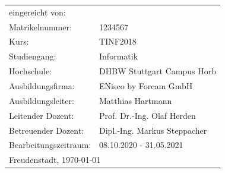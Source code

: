\begin{tabular}{ll}
    eingereicht von:\hspace{1cm} & \author{}
    \tabularnewline
    Matrikelnummer: & 1234567
    \tabularnewline
    Kurs: & TINF2018
    \tabularnewline
    Studiengang: & Informatik
    \tabularnewline
    Hochschule: & DHBW Stuttgart Campus Horb
    \tabularnewline
    Ausbildungsfirma: & ENisco by Forcam GmbH
    \tabularnewline
    Ausbildungsleiter: & Matthias Hartmann
    \tabularnewline
    Leitender Dozent: & Prof. Dr.-Ing. Olaf Herden
    \tabularnewline
    Betreuender Dozent: & Dipl.-Ing. Markus Steppacher
    \tabularnewline
    Bearbeitungszeitraum: & 08.10.2020 - 31.05.2021
    \tabularnewline
    \multicolumn{2}{l}{Freudenstadt, \today}
    \tabularnewline
\end{tabular}

\begin{flushleft}
    \newpage{}
    \par
\end{flushleft}